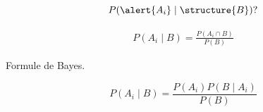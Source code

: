 \documentclass{beamer}
\begin{document}
\begin{frame}[t]
\begin{columns}
\begin{column}{0.6\textwidth}
           {
               $$
               P(\alert{A_i}\;|\; \structure{B})?
               $$
           }

           {
               \scriptsize
               \begin{eqnarray*}
                   P(A_i\;|\;B) = \frac{ P(A_i \cap B)}{P(B)} 
               \end{eqnarray*}
           }
           {
               \begin{block}{Formule de Bayes.}
                   
                   \small
                   $$
                   P(A_i\;|\; B) = \frac{P(A_i) P(B\;|\;A_i)}{P(B)} 
                   $$
               \end{block}
           }
       \end{column}

   \end{columns} 
\end{frame}
\end{document}
